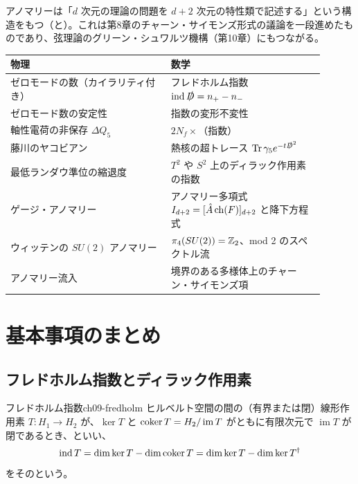 アノマリーは「$d$ 次元の理論の問題を $d+2$ 次元の特性類で記述する」という構造をもつ（と）。これは第8章のチャーン・サイモンズ形式の議論を一段進めたものであり、弦理論のグリーン・シュワルツ機構（第10章）にもつながる。

\begin{physbox}[：本章の辞書]
\begin{center}
\small
\begin{tabular}{p{0.46\linewidth}p{0.44\linewidth}}
物理 & 数学\\ \hline
ゼロモードの数（カイラリティ付き） & フレドホルム指数 $\operatorname{ind}\slashed D=n_+-n_-$\\
ゼロモード数の安定性 & 指数の変形不変性\\
軸性電荷の非保存 $\Delta Q_5$ & $2N_f\times$（指数）\\
藤川のヤコビアン & 熱核の超トレース $\operatorname{Tr}\gamma_5e^{-t\slashed D^2}$\\
最低ランダウ準位の縮退度 & $T^2$ や $S^2$ 上のディラック作用素の指数\\
ゲージ・アノマリー & アノマリー多項式 $I_{d+2}=[\hat{A}\operatorname{ch}(F)]_{d+2}$ と降下方程式\\
ウィッテンの $SU(2)$ アノマリー & $\pi_4(SU(2))=\mathbb{Z}_2$、mod 2 のスペクトル流\\
アノマリー流入 & 境界のある多様体上のチャーン・サイモンズ項
\end{tabular}
\end{center}
\end{physbox}

\section{基本事項のまとめ}

\subsection{フレドホルム指数とディラック作用素}

\begin{mydef}{フレドホルム指数}{ch09-fredholm}
ヒルベルト空間の間の（有界または閉）線形作用素 $T\colon H_1\to H_2$ が、$\ker T$ と $\operatorname{coker} T=H_2/\operatorname{im}T$ がともに有限次元で $\operatorname{im}T$ が閉であるとき、といい、
\[
\operatorname{ind} T=\dim\ker T-\dim\operatorname{coker} T=\dim\ker T-\dim\ker T^\dagger
\]
をそのという。
\end{mydef}

